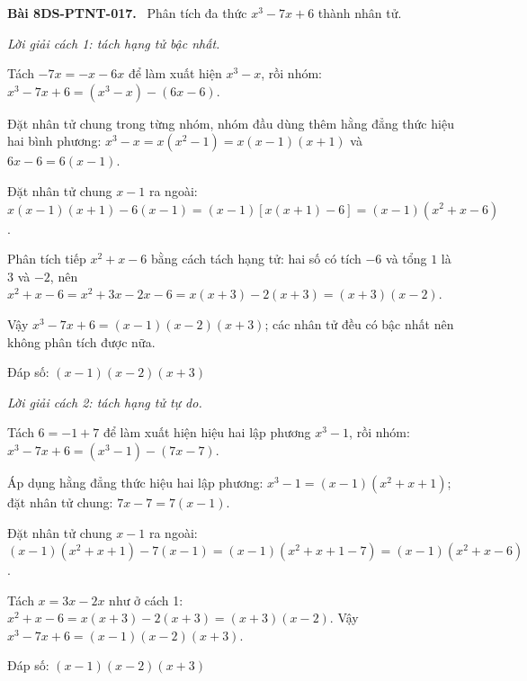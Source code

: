 \documentclass[12pt,a4paper]{article}
\newenvironment{problem}[1][]{\par\medskip\noindent\textbf{Bài #1.}\ }{\par}
\newenvironment{solution}[1][]{\par\noindent\textit{Lời giải #1.}\par}{\par}
\begin{document}
\begin{problem}[8DS-PTNT-017]
Phân tích đa thức $x^3 - 7x + 6$ thành nhân tử.

\begin{solution}[cách 1: tách hạng tử bậc nhất]
Tách $-7x = -x - 6x$ để làm xuất hiện $x^3 - x$, rồi nhóm: $x^3 - 7x + 6 = (x^3 - x) - (6x - 6)$.

Đặt nhân tử chung trong từng nhóm, nhóm đầu dùng thêm hằng đẳng thức hiệu hai bình phương: $x^3 - x = x(x^2 - 1) = x(x - 1)(x + 1)$ và $6x - 6 = 6(x - 1)$.

Đặt nhân tử chung $x - 1$ ra ngoài: $x(x - 1)(x + 1) - 6(x - 1) = (x - 1)\left[x(x + 1) - 6\right] = (x - 1)(x^2 + x - 6)$.

Phân tích tiếp $x^2 + x - 6$ bằng cách tách hạng tử: hai số có tích $-6$ và tổng $1$ là $3$ và $-2$, nên $x^2 + x - 6 = x^2 + 3x - 2x - 6 = x(x + 3) - 2(x + 3) = (x + 3)(x - 2)$.

Vậy $x^3 - 7x + 6 = (x - 1)(x - 2)(x + 3)$; các nhân tử đều có bậc nhất nên không phân tích được nữa.

Đáp số: $\boxed{(x - 1)(x - 2)(x + 3)}$
\end{solution}

\begin{solution}[cách 2: tách hạng tử tự do]
Tách $6 = -1 + 7$ để làm xuất hiện hiệu hai lập phương $x^3 - 1$, rồi nhóm: $x^3 - 7x + 6 = (x^3 - 1) - (7x - 7)$.

Áp dụng hằng đẳng thức hiệu hai lập phương: $x^3 - 1 = (x - 1)(x^2 + x + 1)$; đặt nhân tử chung: $7x - 7 = 7(x - 1)$.

Đặt nhân tử chung $x - 1$ ra ngoài: $(x - 1)(x^2 + x + 1) - 7(x - 1) = (x - 1)(x^2 + x + 1 - 7) = (x - 1)(x^2 + x - 6)$.

Tách $x = 3x - 2x$ như ở cách 1: $x^2 + x - 6 = x(x + 3) - 2(x + 3) = (x + 3)(x - 2)$. Vậy $x^3 - 7x + 6 = (x - 1)(x - 2)(x + 3)$.

Đáp số: $\boxed{(x - 1)(x - 2)(x + 3)}$
\end{solution}
\end{problem}
\end{document}
